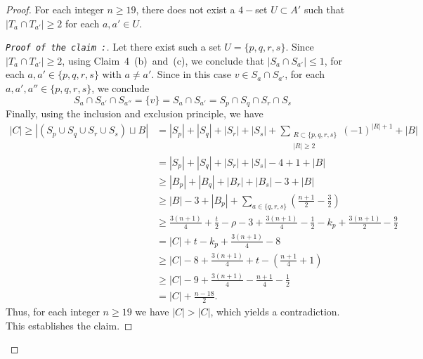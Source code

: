 \documentclass[reqno,10pt]{amsart}
\theoremstyle{definition}
\begin{document}
\begin{proof}
 For each integer $n\geq19$, there does not exist a $4-$set $U\subset A'$ such that $|T_{a}\cap T_{a'}|\geq2$ for each $a,a'\in U$.
\begin{proof}[\tt{Proof of the claim} :]\renewcommand{\qedsymbol}{}
 Let there exist such a set $U= \{p,q,r,s\}$. Since $|T_{a}\cap T_{a'}|\geq2$, using Claim~4~(b)~and~(c), we conclude that  $|S_{a}\cap S_{a'}|\leq 1$, for each $a,a'\in\{p,q,r,s\}$ with $a\neq a'$. Since in this case $v\in S_{a}\cap S_{a'}$, for each $a,a',a''\in\{p,q,r,s\}$, we conclude 
\begin{equation*}
S_{a}\cap S_{a'}\cap S_{a''}=\{v\}=S_{a}\cap S_{a'}=S_{p}\cap S_{q}\cap S_{r}\cap S_{s} 
\end{equation*}
Finally, using the inclusion and exclusion principle, we have 
\begin{align*}
|C|\geq|(S_{p}\cup S_{q}\cup S_{r}\cup S_{s})\sqcup B|&=|S_{p}|+|S_{q}|+|S_{r}|+|S_{s}|+\underset{\substack{R\subset\{p,q,r,s\}\\|R|\geq2}}{\sum}(-1)^{|R|+1}+|B|\\
&=|S_{p}|+|S_{q}|+|S_{r}|+|S_{s}|-4+1+|B|\\
&\geq |B_{p}|+|B_{q}|+|B_{r}|+|B_{s}|-3+|B|\\
&\geq |B|-3+|B_{p}|+\underset{a\in\{q,r,s\}}{\sum}\left(\frac{n+1}{2}-\frac{3}{2}\right)\\
&\geq\frac{3(n+1)}{4}+\frac{t}{2}-\rho-3+\frac{3(n+1)}{4}-\frac{1}{2}-k_{p}+\frac{3(n+1)}{2}-\frac{9}{2}\\
&=|C|+t-k_{p}+\frac{3(n+1)}{4}-8\\
&\geq|C|-8+\frac{3(n+1)}{4}+t-\left(\frac{n+1}{4}+1\right)\\
&\geq|C|-9+\frac{3(n+1)}{4}-\frac{n+1}{4}-\frac{1}{2}\\
&=|C|+\frac{n-18}{2}.
\end{align*}	
Thus, for each integer $n\geq19$ we have $|C|>|C|$, which yields a contradiction. This establishes the claim.
\end{proof}	


\end{proof}
\end{document}
